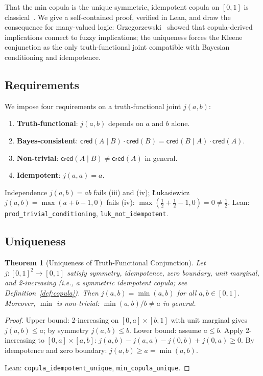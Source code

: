 \documentclass[11pt,a4paper]{article}
\newtheorem{theorem}{Theorem}[section]
\newcommand{\cred}{\mathsf{cred}}
\begin{document}
That the min copula is the unique symmetric, idempotent copula on
$[0,1]$ is classical~\cite[Theorem~2.3.5]{nelsen2006}.
We give a self-contained proof, verified in Lean, and draw the
consequence for many-valued logic:
Grzegorzewski~\cite{grzegorzewski2013} showed that copula-derived
implications connect to fuzzy implications; the uniqueness forces the
Kleene conjunction as the only truth-functional joint compatible with
Bayesian conditioning and idempotence.

\subsection{Requirements}

We impose four requirements on a truth-functional joint $j(a,b)$:
\begin{enumerate}[label=(\roman*),nosep]
\item \textbf{Truth-functional}: $j(a,b)$ depends on $a$ and $b$ alone.
\item \textbf{Bayes-consistent}:
  $\cred(A \mid B) \cdot \cred(B) = \cred(B \mid A) \cdot \cred(A)$.
\item \textbf{Non-trivial}: $\cred(A \mid B) \neq \cred(A)$ in general.
\item \textbf{Idempotent}: $j(a,a) = a$.
\end{enumerate}
Independence $j(a,b) = ab$ fails (iii) and (iv);
\L ukasiewicz $j(a,b) = \max(a+b-1,0)$ fails (iv):
$\max(\tfrac{1}{2} + \tfrac{1}{2} - 1, 0) = 0 \neq \tfrac{1}{2}$.
Lean: \texttt{prod\_trivial\_conditioning},
\texttt{luk\_not\_idempotent}.

\subsection{Uniqueness}

\begin{theorem}[Uniqueness of Truth-Functional Conjunction]
\label{thm:uniqueness-main}
\label{thm:min-copula-unique}
Let $j : [0,1]^2 \to [0,1]$ satisfy symmetry, idempotence,
zero boundary, unit marginal, and 2-increasing
(i.e., a symmetric idempotent copula; see Definition~\ref{def:copula}).
Then $j(a,b) = \min(a,b)$ for all $a,b \in [0,1]$.
Moreover, $\min$ is non-trivial: $\min(a,b)/b \neq a$ in general.
\end{theorem}

\begin{proof}
Upper bound: 2-increasing on $[0,a] \times [b,1]$ with unit marginal
gives $j(a,b) \leq a$; by symmetry $j(a,b) \leq b$.
Lower bound: assume $a \leq b$.
Apply 2-increasing to $[0,a] \times [a,b]$:
$j(a,b) - j(a,a) - j(0,b) + j(0,a) \geq 0$.
By idempotence and zero boundary: $j(a,b) \geq a = \min(a,b)$.

Lean: \texttt{copula\_idempotent\_unique},
\texttt{min\_copula\_unique}.
\end{proof}
\end{document}
